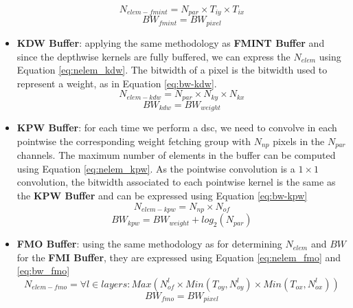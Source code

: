 \begin{itemize}
    \begin{equation}
        N_{elem-fmint} = N_{par} \times T_{iy} \times T_{ix}
        \label{eq:nelem_fmint}
    \end{equation}
    \begin{equation}
        BW_{fmint} = BW_{pixel}
        \label{eq:bw-fmint}
    \end{equation}
    \item \textbf{KDW Buffer}: applying the same methodology as \textbf{FMINT Buffer} and since the depthwise kernels are fully buffered, we can express the $N_{elem}$ using Equation \eqref{eq:nelem_kdw}. The bitwidth of a pixel is the bitwidth used to represent a weight, as in Equation \eqref{eq:bw-kdw}.
    \begin{equation}
        N_{elem-kdw} = N_{par} \times N_{ky} \times N_{kx}
        \label{eq:nelem_kdw}
    \end{equation}
    \begin{equation}
        BW_{kdw} = BW_{weight}
        \label{eq:bw-kdw}
    \end{equation}
    \item \textbf{KPW Buffer}: for each time we perform a \acrshort{dsc}, we need to convolve in each pointwise the corresponding weight fetching group with $N_{np}$ pixels in the $N_{par}$ channels. The maximum number of elements in the buffer can be computed using Equation \eqref{eq:nelem_kpw}. As the pointwise convolution is a $1 \times 1$ convolution, the bitwidth associated to each pointwise kernel is the same as the \textbf{KPW Buffer} and can be expressed using Equation \ref{eq:bw-kpw}
    \begin{equation}
        N_{elem-kpw} = N_{np} \times N_{of}
        \label{eq:nelem_kpw}
    \end{equation}
    \begin{equation}
        BW_{kpw} = BW_{weight} + log_2(N_{par})
        \label{eq:bw-kpw}
    \end{equation}
    \item \textbf{FMO Buffer}: using the same methodology as for determining $N_{elem}$ and $BW$ for the \textbf{FMI Buffer}, they are expressed using Equation \eqref{eq:nelem_fmo} and \eqref{eq:bw_fmo}
    \begin{equation}
        N_{elem-fmo} = \forall l \in layers: Max\left( N_{of}^l \times Min\left(T_{oy}, N_{oy}^l\right) \times Min\left(T_{ox}, N_{ox}^l\right) \right)
        \label{eq:nelem_fmo}
    \end{equation}
    \begin{equation}
        BW_{fmo} = BW_{pixel}
        \label{eq:bw_fmo}
    \end{equation}
\end{itemize}
